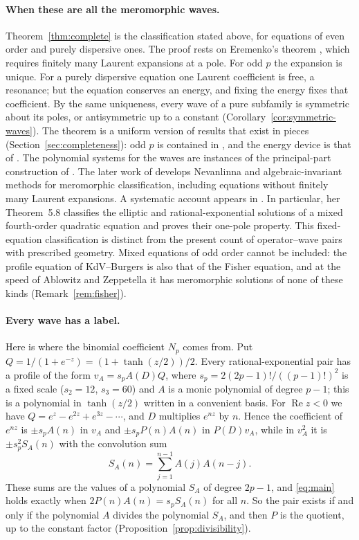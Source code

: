 \documentclass[11pt]{article}
\theoremstyle{definition}
\theoremstyle{remark}
\numberwithin{equation}{section}
\begin{document}
\paragraph{When these are all the meromorphic waves.}
Theorem~\ref{thm:complete} is the classification stated above, for
equations of even order and purely dispersive ones. The proof rests on
Eremenko's theorem \citep{Eremenko2006}, which requires finitely many
Laurent expansions at a pole. For odd \(p\) the expansion is unique. For
a purely dispersive equation one Laurent coefficient is free, a
resonance; but the equation conserves an energy, and fixing the energy
fixes that coefficient. By the same uniqueness, every wave of a pure
subfamily is symmetric about its poles, or antisymmetric up to a
constant (Corollary~\ref{cor:symmetric-waves}). The theorem is a uniform
version of results that exist in pieces
(Section~\ref{sec:completeness}): odd \(p\) is contained in
\citet[Theorem~1]{YuanLiQi2014}, and the energy device is that of
\citet[Lemmas~3--4]{EremenkoLiaoNg2009}. The polynomial systems for the
waves are instances of the principal-part construction of
\citet{DeminaKudryashov2011,DeminaKudryashovElliptic2011}.
The later work of \citet{Demina2019,Demina2022} develops
Nevanlinna and algebraic-invariant methods for meromorphic
classification, including equations without finitely many Laurent
expansions. A systematic account appears in
\citet[Chapter~5]{BelovaThesis}. In particular, her
Theorem~5.8 classifies the elliptic and rational-exponential solutions
of a mixed fourth-order quadratic equation and proves their
one-pole property. This fixed-equation classification is distinct
from the present count of operator--wave pairs with prescribed
geometry. Mixed
equations of odd order cannot be included: the profile equation of
KdV--Burgers is also that of the Fisher equation, and at the speed of
Ablowitz and Zeppetella it has meromorphic solutions of none of these
kinds (Remark~\ref{rem:fisher}).

\paragraph{Every wave has a label.}
Here is where the binomial coefficient \(N_p\) comes from. Put
\(Q=1/(1+e^{-z})=(1+\tanh(z/2))/2\). Every rational-exponential pair has
a profile of the form \(v_A=s_pA(D)Q\), where
\(s_p=2(2p-1)!/((p-1)!)^2\) is a fixed scale (\(s_2=12\), \(s_3=60\))
and \(A\) is a monic polynomial of degree \(p-1\); this is a polynomial
in \(\tanh(z/2)\) written in a convenient basis. For
\(\operatorname{Re}z<0\) we have \(Q=e^z-e^{2z}+e^{3z}-\cdots\), and
\(D\) multiplies \(e^{nz}\) by \(n\). Hence the coefficient of
\(e^{nz}\) is \(\pm s_pA(n)\) in \(v_A\) and \(\pm s_pP(n)A(n)\) in
\(P(D)v_A\), while in \(v_A^2\) it is \(\pm s_p^2S_A(n)\) with the
convolution sum
\[
 S_A(n)=\sum_{j=1}^{n-1}A(j)A(n-j).
\]
These sums are the values of a polynomial \(S_A\) of degree \(2p-1\),
and \eqref{eq:main} holds exactly when \(2P(n)A(n)=s_pS_A(n)\) for all
\(n\). So the pair exists if and only if the polynomial \(A\) divides
the polynomial \(S_A\), and then \(P\) is the quotient, up to the
constant factor (Proposition~\ref{prop:divisibility}).
\end{document}
